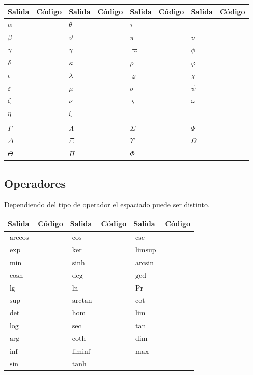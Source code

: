 \documentclass{article}
\numberwithin{equation}{section}
\theoremstyle{plain}
\theoremstyle{definition}
\theoremstyle{remark}
\def\X#1{$#1$ & \texttt{#1}} %
\begin{document}
\begin{table}[H]
\centering
\begin{tabular}{@{}*8l@{}}
\toprule
Salida & Código & Salida & Código & Salida & Código & Salida & Código \\
\midrule
\X\alpha        &\X\theta       & \X\tau      &         &        \\
\X\beta         &\X\vartheta    &\X\pi          &\X\upsilon     \\
\X\gamma        &\X\gamma       &\X\varpi       &\X\phi         \\
\X\delta        &\X\kappa       &\X\rho         &\X\varphi      \\
\X\epsilon      &\X\lambda      &\X\varrho      &\X\chi         \\
\X\varepsilon   &\X\mu          &\X\sigma       &\X\psi         \\
\X\zeta         &\X\nu          &\X\varsigma    &\X\omega       \\
\X\eta          &\X\xi                                          \\
                                                                \\
\X\Gamma        &\X\Lambda      &\X\Sigma       &\X\Psi         \\
\X\Delta        &\X\Xi          &\X\Upsilon     &\X\Omega       \\
\X\Theta        &\X\Pi          &\X\Phi\\
\bottomrule
\end{tabular}
\end{table}

    
\subsection{Operadores}

 Dependiendo del tipo de operador el espaciado puede ser distinto.



\begin{table}[h]
\centering
\begin{tabular}{@{}*6l@{}}
\toprule
Salida & Código & Salida & Código & Salida & Código \\
\midrule
\X\arccos & \X\cos & \X\csc \\
\X\exp &  \X\ker & \X\limsup \\
\X\min & \X\sinh & \X\arcsin \\
\X\cosh & \X\deg &  \X\gcd \\ 
\X\lg & \X\ln & \X\Pr \\ 
\X\sup & \X\arctan &  \X\cot \\
\X\det & \X\hom & \X\lim \\ 
\X\log & \X\sec &  \X\tan \\
\X\arg & \X\coth & \X\dim  \\
\X\inf & \X\liminf & \X\max \\
\X\sin & \X\tanh & \\
\bottomrule
\end{tabular}
\end{table}
\end{document}

